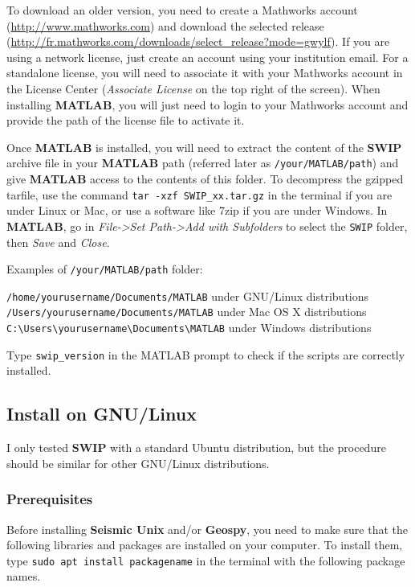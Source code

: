 \documentclass[twoside,a4paper]{article}
\def\SWIP{\textbf{SWIP}}
\def\SeismicUnix{\textbf{Seismic Unix}}
\def\Geopsy{\textbf{Geospy}}
\def\MATLAB{\textbf{MATLAB}}
\begin{document}
To download an older version, you need to create a Mathworks account (\url{http://www.mathworks.com}) and download the selected release (\url{http://fr.mathworks.com/downloads/select_release?mode=gwylf}). If you are using a network license, just create an account using your institution email. For a standalone license, you will need to associate it with your Mathworks account in the License Center (\textit{Associate License} on the top right of the screen). When installing {\MATLAB}, you will just need to login to your Mathworks account and provide the path of the license file to activate it.

Once {\MATLAB} is installed, you will need to extract the content of the {\SWIP} archive file in your {\MATLAB} path (referred later as \verb|/your/MATLAB/path|) and give {\MATLAB} access to the contents of this folder. To decompress the gzipped tarfile, use the command \verb|tar -xzf SWIP_xx.tar.gz| in the terminal if you are under Linux or Mac, or use a software like 7zip if you are under Windows. In {\MATLAB}, go in \textit{File->Set Path->Add with Subfolders} to select the \verb|SWIP| folder, then \textit{Save} and \textit{Close}.

Examples of \verb|/your/MATLAB/path| folder:

\verb|/home/yourusername/Documents/MATLAB| under GNU/Linux distributions\\
\verb|/Users/yourusername/Documents/MATLAB| under Mac OS X distributions\\
\verb|C:\Users\yourusername\Documents\MATLAB| under Windows distributions

Type \verb|swip_version| in the MATLAB prompt to check if the scripts are correctly installed.

\clearpage
\subsection{Install on GNU/Linux}
I only tested {\SWIP} with a standard Ubuntu distribution, but the procedure should be similar for other GNU/Linux distributions.
\subsubsection{Prerequisites}
Before installing {\SeismicUnix} and/or {\Geopsy}, you need to make sure that the following libraries and packages are installed on your computer. To install them, type \verb|sudo apt install packagename| in the terminal with the following package names.
\end{document}
